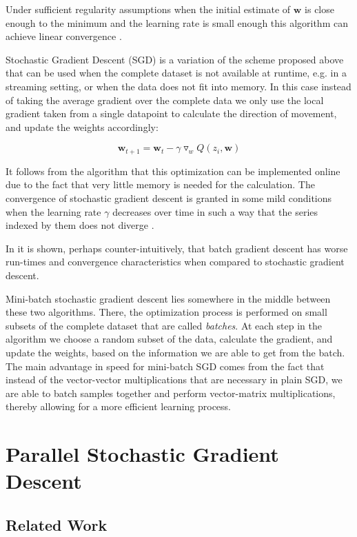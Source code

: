 \documentclass[11pt,a4paper]{article}
\newcommand{\Wb}{\mathbf{w}}
\begin{document}
Under sufficient regularity assumptions when the initial estimate of $\Wb$ is close enough to the
minimum and the learning rate is small enough this algorithm can achieve linear convergence
\citep{dennis1996numerical}.

Stochastic Gradient Descent (SGD) is a variation of the scheme proposed above that can be used
when the complete dataset is not available at runtime, e.g. in a streaming setting,
or when the data does not fit into memory.
In this case instead of taking the average gradient over the complete data we only use the local
gradient taken from a single datapoint to calculate the direction of movement, and update the
weights accordingly:

\begin{equation}
\Wb_{t + 1} = \Wb_t - \gamma  \triangledown_w Q(z_i, \Wb)
\end{equation}

It follows from the algorithm that this optimization can be implemented online due to the fact that
very little memory is needed for the calculation. The convergence of stochastic gradient descent is granted
in  some mild conditions when the learning rate $\gamma$ decreases over time in such a way that the
series  indexed by them does not diverge \citep{bottou2010large}.

In \citep{wilson2003general} it is shown, perhaps counter-intuitively, that batch gradient descent has
worse run-times and convergence characteristics when compared to stochastic gradient descent.

Mini-batch stochastic gradient descent lies somewhere in the middle between these two algorithms.
There, the optimization process is performed on small subsets of the complete dataset that are
called \textit{batches}. At each step in the algorithm we choose a random subset of the data,
calculate the gradient, and update the weights, based on the information we are able to get from
the batch. The main advantage in speed for mini-batch SGD comes from the fact that instead of the
vector-vector multiplications that are necessary in plain SGD, we are able to batch samples
together and perform vector-matrix multiplications, thereby allowing for a more efficient learning
process.

\section{Parallel Stochastic Gradient Descent}
\subsection{Related Work}
\end{document}
